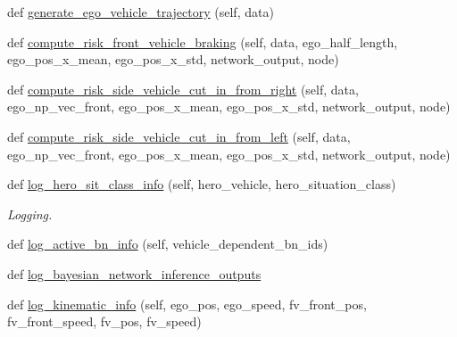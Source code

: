 \begin{DoxyCompactItemize}
\item 
def \hyperlink{classimplementation_1_1sinadra__risk__sensor__client_1_1_sinadra_client_ab5ac8b18ba8535ceeb08924a083538f0}{generate\+\_\+ego\+\_\+vehicle\+\_\+trajectory} (self, data)
\item 
def \hyperlink{classimplementation_1_1sinadra__risk__sensor__client_1_1_sinadra_client_a4f5ba0eceaba2fd5bb3134a221e9b705}{compute\+\_\+risk\+\_\+front\+\_\+vehicle\+\_\+braking} (self, data, ego\+\_\+half\+\_\+length, ego\+\_\+pos\+\_\+x\+\_\+mean, ego\+\_\+pos\+\_\+x\+\_\+std, network\+\_\+output, node)
\item 
def \hyperlink{classimplementation_1_1sinadra__risk__sensor__client_1_1_sinadra_client_a8e493d0fd00a2662527603365f07e92e}{compute\+\_\+risk\+\_\+side\+\_\+vehicle\+\_\+cut\+\_\+in\+\_\+from\+\_\+right} (self, data, ego\+\_\+np\+\_\+vec\+\_\+front, ego\+\_\+pos\+\_\+x\+\_\+mean, ego\+\_\+pos\+\_\+x\+\_\+std, network\+\_\+output, node)
\item 
def \hyperlink{classimplementation_1_1sinadra__risk__sensor__client_1_1_sinadra_client_a5b19f550350c401fc6565e6451e712e6}{compute\+\_\+risk\+\_\+side\+\_\+vehicle\+\_\+cut\+\_\+in\+\_\+from\+\_\+left} (self, data, ego\+\_\+np\+\_\+vec\+\_\+front, ego\+\_\+pos\+\_\+x\+\_\+mean, ego\+\_\+pos\+\_\+x\+\_\+std, network\+\_\+output, node)
\item 
def \hyperlink{classimplementation_1_1sinadra__risk__sensor__client_1_1_sinadra_client_a901977934f44713c406f388873681c71}{log\+\_\+hero\+\_\+sit\+\_\+class\+\_\+info} (self, hero\+\_\+vehicle, hero\+\_\+situation\+\_\+class)
\begin{DoxyCompactList}\small\item\em Logging. \end{DoxyCompactList}\item 
def \hyperlink{classimplementation_1_1sinadra__risk__sensor__client_1_1_sinadra_client_a4c37db8ca3e27a6a8d169863b30bbcf6}{log\+\_\+active\+\_\+bn\+\_\+info} (self, vehicle\+\_\+dependent\+\_\+bn\+\_\+ids)
\item 
def \hyperlink{classimplementation_1_1sinadra__risk__sensor__client_1_1_sinadra_client_a421d4d0f2e706d5a77db9a052ab83ec3}{log\+\_\+bayesian\+\_\+network\+\_\+inference\+\_\+outputs}
\item 
def \hyperlink{classimplementation_1_1sinadra__risk__sensor__client_1_1_sinadra_client_a921e207c7a0988fd03410064e6c1842d}{log\+\_\+kinematic\+\_\+info} (self, ego\+\_\+pos, ego\+\_\+speed, fv\+\_\+front\+\_\+pos, fv\+\_\+front\+\_\+speed, fv\+\_\+pos, fv\+\_\+speed)
\end{DoxyCompactItemize}
